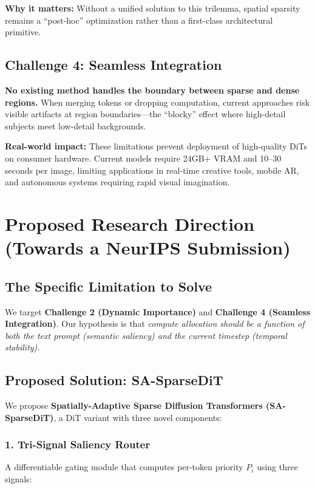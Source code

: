 \documentclass{article}
\begin{document}
\textbf{Why it matters:} Without a unified solution to this trilemma,
spatial sparsity remains a ``post-hoc'' optimization rather than a
first-class architectural primitive.

\subsection{Challenge 4: Seamless Integration}
\textbf{No existing method handles the boundary between sparse and dense
    regions.} When merging tokens or dropping computation, current approaches
risk visible artifacts at region boundaries—the ``blocky'' effect where
high-detail subjects meet low-detail backgrounds.

\textbf{Real-world impact:} These limitations prevent deployment of
high-quality DiTs on consumer hardware. Current models require 24GB+ VRAM
and 10--30 seconds per image, limiting applications in real-time creative
tools, mobile AR, and autonomous systems requiring rapid visual
imagination.

\section{Proposed Research Direction (Towards a NeurIPS Submission)}

\subsection{The Specific Limitation to Solve}
We target \textbf{Challenge 2 (Dynamic Importance)} and \textbf{Challenge 4
    (Seamless Integration)}. Our hypothesis is that \textit{compute allocation
    should be a function of both the text prompt (semantic saliency) and the
    current timestep (temporal stability).}

\subsection{Proposed Solution: SA-SparseDiT}

We propose \textbf{Spatially-Adaptive Sparse Diffusion Transformers
    (SA-SparseDiT)}, a DiT variant with three novel components:

\subsubsection{1. Tri-Signal Saliency Router}
A differentiable gating module that computes per-token priority $P_i$ using
three signals:
\end{document}
